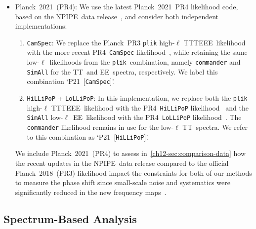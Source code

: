 \begin{itemize}
	\item Planck~2021~(PR4): We use the latest Planck~2021~PR4 likelihood code, based on the NPIPE~data release~\cite{Planck:2020olo}, and consider both independent implementations:
	\begin{enumerate}
		\item \texttt{CamSpec}: We replace the Planck~PR3 \texttt{plik} \mbox{high-$\ell$} TTTEEE~likelihood with the more recent PR4~\texttt{CamSpec} likelihood~\cite{Efstathiou:2019mdh, Rosenberg:2022sdy}, while retaining the same \mbox{low-$\ell$}~likelihoods from the \texttt{plik}~combination, namely \texttt{commander} and \texttt{SimAll} for the TT~and EE~spectra, respectively. We label this combination `P21~[\texttt{CamSpec}]'.
		\item \texttt{HiLLiPoP} + \texttt{LoLLiPoP}: In this implementation, we replace both the \texttt{plik} \mbox{high-$\ell$} TTTEEE~likelihood with the PR4~\texttt{HiLLiPoP} likelihood~\cite{Tristram:2020wbi,Tristram:2023haj} and the \texttt{SimAll} \mbox{low-$\ell$}~EE~likelihood with the PR4~\texttt{LoLLiPoP} likelihood~\cite{Tristram:2020wbi,Tristram:2023haj}. The \texttt{commander} likelihood remains in use for the low-$\ell$ TT~spectra. We refer to this combination as `P21~[\texttt{HiLLiPoP}]'.
	\end{enumerate}
	We include Planck~2021~(PR4) to assess in~\textsection\ref{ch12-sec:comparison-data} how the recent updates in the NPIPE~data release compared to the official Planck~2018~(PR3) likelihood impact the constraints for both of our methods to measure the phase shift since small-scale noise and systematics were significantly reduced in the new frequency maps~\cite{Planck:2020olo, Rosenberg:2022sdy, Tristram:2023haj}.
\end{itemize}


\subsection{Spectrum-Based Analysis}
\label{ch12-sec:spectrum-analysis}

